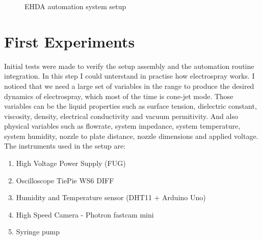 
\begin{figure}[H]
  \centering
  \caption{EHDA automation system setup}
  \label{fig:setup}
\end{figure}


\section{First Experiments}
\label{sec:first_experiments}

Initial tests were made to verify the setup assembly and the automation routine integration. In this step I could unterstand in practise how electrospray works.
I noticed that we need a large set of variables in the range to produce the desired dynamics of electrospray, which most of the time is cone-jet mode. Those variables can be the liquid properties such as surface tension, dielectric constant, viscosity, density, electrical conductivity and vacuum permitivity. And also physical variables such as flowrate, system impedance, system temperature, system humidity, nozzle to plate distance, nozzle dimensions and applied voltage.
The instruments used in the setup are:

\begin{enumerate}[a]
  \item High Voltage Power Supply (FUG)
  \item Oscilloscope TiePie WS6 DIFF 
  \item Humidity and Temperature sensor (DHT11 + Arduino Uno)
  \item High Speed Camera - Photron fastcam mini
  \item Syringe pump
  \end{enumerate}


\clearpage
